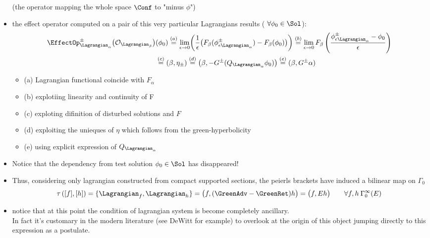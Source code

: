 \documentclass[a4paper,11pt]{scrartcl}
\begin{document}
\begin{itemize}
		(the operator mapping the whole space $\Conf$ to  "minus $\phi$")
		\item the effect operator computed on a pair of this very particular Lagrangians results ( $\forall 	\phi_0\in \Sol$):
		\begin{align}
			\EffectOp_{\Lagrangian_\alpha}^\pm \big( \mathcal{O}_{\Lagrangian_\beta} \big)& (\phi_0) 
			\stackrel{(a)}{=}
			 \lim_{\epsilon \rightarrow 0} \biggr( \frac{1}{\epsilon}\big(F_\beta ( \phi_{\epsilon \Lagrangian_\alpha}^\pm) - F_\beta(\phi_0) \big) \biggr) 
			\stackrel{(b)}{=}
			\lim_{\epsilon \rightarrow 0} F_\beta\left( \frac{ \phi_{\epsilon \Lagrangian_\alpha}^\pm- \phi_0}{\epsilon} \right)  
						\nonumber\\
			&\stackrel{(c)}{=} (\beta, \eta_\pm) 
				\stackrel{(d)}{=} \big( \beta, - G^\pm (Q_{\Lagrangian_\alpha} \phi_0 ) \big) 
				\stackrel{(e)}{=} ( \beta, G^\pm \alpha) \nonumber
		\end{align}
		\begin{footnotesize}\begin{itemize}
			\item	(a) Lagrangian functional coincide with $F_\alpha$
			\item (b) explotiing linearity and continuity of F
			\item (c) exploting difinition of disturbed solutions and $F$
			\item (d) exploiting the unieques of $\eta$ which follows from the green-hyperbolicity
			\item (e) using explicit expression of $Q_{\Lagrangian_\alpha}$
		\end{itemize}\end{footnotesize}
		\item Notice that the dependency from test solution $\phi_0 \in \Sol$ has disappeared!
		\item Thus, considering only lagrangian constructed from compact supported sections, the peierls brackets have induced a bilinear map on $\Gamma_0$
		$$ 							\tau\left( [f] , [h]\right) = \{\Lagrangian_f , \Lagrangian_h\} = \big( f , (\GreenAdv - \GreenRet)h \big) = \big(f, E h\big) \qquad \forall f,h \: \Gamma_0^\infty (E)$$
		\item notice that at this point the condition of lagrangian system is become completely ancillary.\\
		In fact it's customary in the modern literature (see DeWitt for example) to overlook at the origin of this object jumping directly to this expression as a postulate.

\end{itemize}
\end{document}
